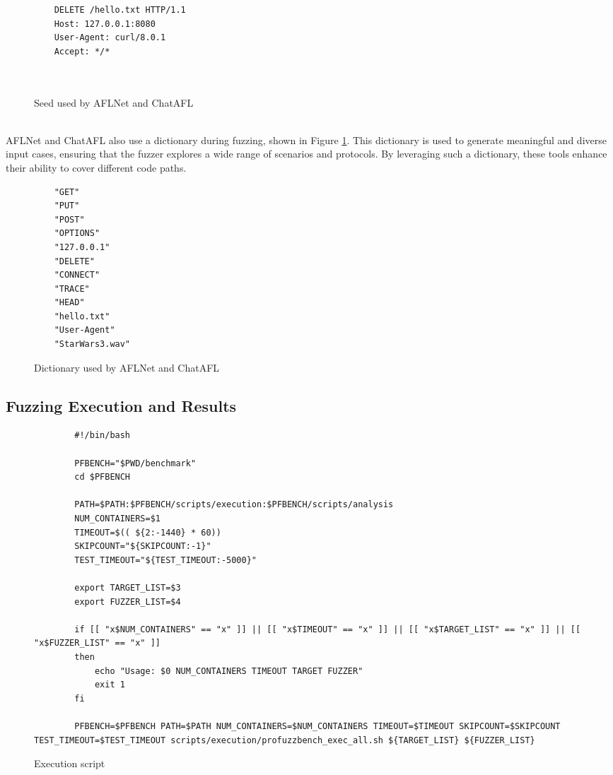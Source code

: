 \begin{figure}[H]
    \centering
    \begin{adjustbox}{valign=t}
    \begin{lstlisting}
    DELETE /hello.txt HTTP/1.1
    Host: 127.0.0.1:8080
    User-Agent: curl/8.0.1
    Accept: */*

    
    \end{lstlisting}
    \end{adjustbox}
    \caption{Seed used by AFLNet and ChatAFL}
\end{figure}
\phantom{}\\
AFLNet and ChatAFL also use a dictionary during fuzzing, shown in Figure \ref{fig:dictionary}. This dictionary is used to generate meaningful and diverse input cases, ensuring that the fuzzer explores a wide range of scenarios and protocols. By leveraging such a dictionary, these tools enhance their ability to cover different code paths.
\begin{figure}[H]
    \centering
    \begin{adjustbox}{valign=t}
    \begin{lstlisting}
    "GET"
    "PUT"
    "POST"
    "OPTIONS"
    "127.0.0.1"
    "DELETE"
    "CONNECT"
    "TRACE"
    "HEAD"
    "hello.txt"
    "User-Agent"
    "StarWars3.wav"
    \end{lstlisting}
    \end{adjustbox}
    \caption{Dictionary used by AFLNet and ChatAFL}
    \label{fig:dictionary}
\end{figure}

\subsection{Fuzzing Execution and Results}

\begin{figure}[H]
    \begin{lstlisting}
        #!/bin/bash

        PFBENCH="$PWD/benchmark"
        cd $PFBENCH

        PATH=$PATH:$PFBENCH/scripts/execution:$PFBENCH/scripts/analysis
        NUM_CONTAINERS=$1
        TIMEOUT=$(( ${2:-1440} * 60))
        SKIPCOUNT="${SKIPCOUNT:-1}"
        TEST_TIMEOUT="${TEST_TIMEOUT:-5000}"

        export TARGET_LIST=$3
        export FUZZER_LIST=$4

        if [[ "x$NUM_CONTAINERS" == "x" ]] || [[ "x$TIMEOUT" == "x" ]] || [[ "x$TARGET_LIST" == "x" ]] || [[ "x$FUZZER_LIST" == "x" ]]
        then
            echo "Usage: $0 NUM_CONTAINERS TIMEOUT TARGET FUZZER"
            exit 1
        fi

        PFBENCH=$PFBENCH PATH=$PATH NUM_CONTAINERS=$NUM_CONTAINERS TIMEOUT=$TIMEOUT SKIPCOUNT=$SKIPCOUNT TEST_TIMEOUT=$TEST_TIMEOUT scripts/execution/profuzzbench_exec_all.sh ${TARGET_LIST} ${FUZZER_LIST}
    \end{lstlisting}
    \caption{Execution script}
    \label{fig:exec_script_aflnetchatafl}
\end{figure}

